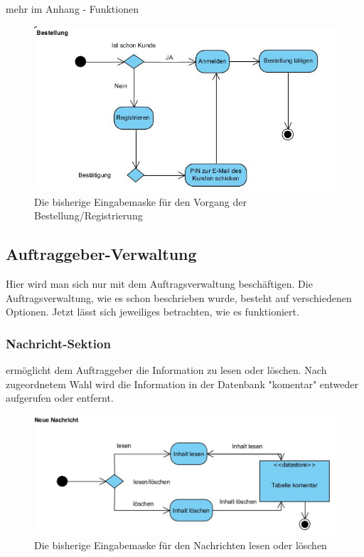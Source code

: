 mehr im Anhang - Funktionen

\begin{figure}[h]
	\centering
	\includegraphics[width=0.9\linewidth]{Graphics/Bestellung.JPG}
	\caption[Anmeldung/Bestellung]{Die bisherige Eingabemaske für den Vorgang der Bestellung/Registrierung}
	\label{fig:Bestellung}
\end{figure}

\subsection{Auftraggeber-Verwaltung}

Hier wird man sich nur mit dem Auftragsverwaltung beschäftigen. Die Auftragsverwaltung, wie es schon beschrieben wurde, besteht auf verschiedenen Optionen. Jetzt lässt sich jeweiliges betrachten, wie es funktioniert. 
	
\subsubsection{Nachricht-Sektion} ermöglicht dem Auftraggeber die Information zu lesen oder löschen. Nach zugeordnetem Wahl wird die Information in der Datenbank "komentar" entweder aufgerufen oder entfernt. 

\begin{figure}[h]
	\centering
	\includegraphics[width=0.8\linewidth]{Graphics/NeueNachricht.JPG}
	\caption[Kommunikation]{Die bisherige Eingabemaske für den Nachrichten lesen oder löschen}
	\label{fig:Kommunikation}
\end{figure}



